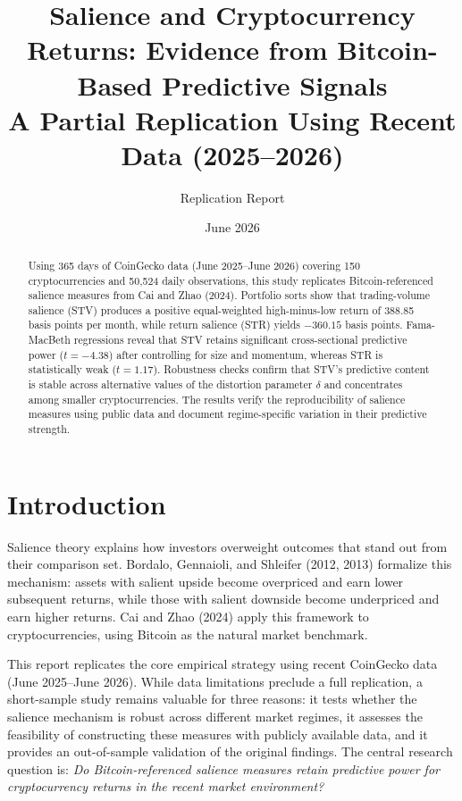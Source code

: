 \documentclass[11pt]{article}
\title{\textbf{Salience and Cryptocurrency Returns: Evidence from Bitcoin-Based Predictive Signals}\\
\large A Partial Replication Using Recent Data (2025--2026)}
\author{Replication Report}
\date{June 2026}
\begin{document}
\maketitle

\begin{abstract}
Using 365 days of CoinGecko data (June 2025--June 2026) covering 150 cryptocurrencies and 50,524 daily observations, this study replicates Bitcoin-referenced salience measures from Cai and Zhao (2024). Portfolio sorts show that trading-volume salience (STV) produces a positive equal-weighted high-minus-low return of 388.85 basis points per month, while return salience (STR) yields $-360.15$ basis points. Fama-MacBeth regressions reveal that STV retains significant cross-sectional predictive power ($t = -4.38$) after controlling for size and momentum, whereas STR is statistically weak ($t = 1.17$). Robustness checks confirm that STV's predictive content is stable across alternative values of the distortion parameter $\delta$ and concentrates among smaller cryptocurrencies. The results verify the reproducibility of salience measures using public data and document regime-specific variation in their predictive strength.
\end{abstract}

\section{Introduction}

Salience theory explains how investors overweight outcomes that stand out from their comparison set. Bordalo, Gennaioli, and Shleifer (2012, 2013) formalize this mechanism: assets with salient upside become overpriced and earn lower subsequent returns, while those with salient downside become underpriced and earn higher returns. Cai and Zhao (2024) apply this framework to cryptocurrencies, using Bitcoin as the natural market benchmark.

This report replicates the core empirical strategy using recent CoinGecko data (June 2025--June 2026). While data limitations preclude a full replication, a short-sample study remains valuable for three reasons: it tests whether the salience mechanism is robust across different market regimes, it assesses the feasibility of constructing these measures with publicly available data, and it provides an out-of-sample validation of the original findings. The central research question is: \textit{Do Bitcoin-referenced salience measures retain predictive power for cryptocurrency returns in the recent market environment?}
\end{document}
